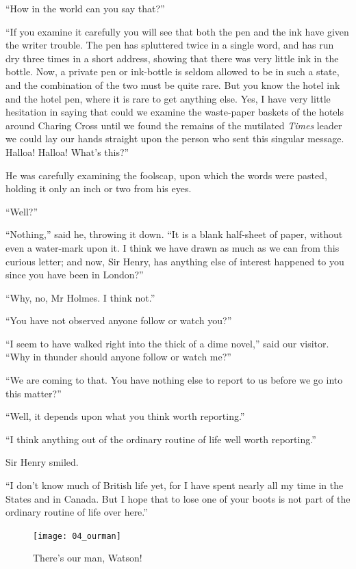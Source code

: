 \documentclass[paper=5.5in:8.5in,BCOR=7mm,twoside,DIV=calc,12pt,usegeometry,openany,chapterprefix,endperiod]{scrbook} %
\begin{document}
\enquote{How in the world can you say that?}

\enquote{If you examine it carefully you will see that both the pen and the ink have given the writer trouble. The pen has spluttered twice in a single word, and has run dry three times in a short address, showing that there was very little ink in the bottle. Now, a private pen or ink-bottle is seldom allowed to be in such a state, and the combination of the two must be quite rare. But you know the hotel ink and the hotel pen, where it is rare to get anything else. Yes, I have very little hesitation in saying that could we examine the waste-paper baskets of the hotels around Charing Cross until we found the remains of the mutilated \textit{Times} leader we could lay our hands straight upon the person who sent this singular message. Halloa! Halloa! What's this?}

He was carefully examining the foolscap, upon which the words were pasted, holding it only an inch or two from his eyes.

\enquote{Well?}

\enquote{Nothing,} said he, throwing it down. \enquote{It is a blank half-sheet of paper, without even a water-mark upon it. I think we have drawn as much as we can from this curious letter; and now, Sir Henry, has anything else of interest happened to you since you have been in London?}

\enquote{Why, no, Mr Holmes. I think not.}

\enquote{You have not observed anyone follow or watch you?}

\enquote{I seem to have walked right into the thick of a dime novel,} said our visitor. \enquote{Why in thunder should anyone follow or watch me?}

\enquote{We are coming to that. You have nothing else to report to us before we go into this matter?}

\enquote{Well, it depends upon what you think worth reporting.}

\enquote{I think anything out of the ordinary routine of life well worth reporting.}

Sir Henry smiled.

\enquote{I don't know much of British life yet, for I have spent nearly all my time in the States and in Canada. But I hope that to lose one of your boots is not part of the ordinary routine of life over here.}

\begin{figure}[tbph]
\centering
\texttt{[image: 04\_ourman]}
\caption{There's our man, Watson!}
\end{figure}
\end{document}
